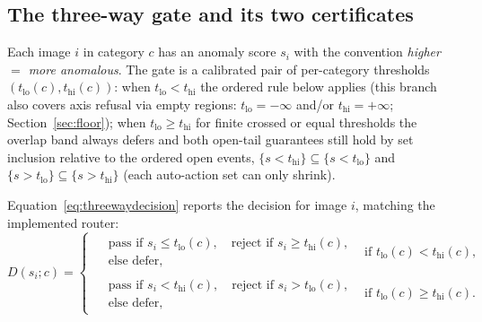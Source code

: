 \documentclass[preprint,11pt]{elsarticle}
\begin{document}
\subsection{The three-way gate and its two certificates}
\label{sec:gate}

Each image $i$ in category $c$ has an anomaly score $s_i$ with the convention \emph{higher
$=$ more anomalous}. The gate is a calibrated pair of per-category thresholds
$(t_{\text{lo}}(c), t_{\text{hi}}(c))$: when $t_{\text{lo}} < t_{\text{hi}}$ the ordered rule
below applies (this branch also covers axis refusal via empty regions:
$t_{\text{lo}}=-\infty$ and/or $t_{\text{hi}}=+\infty$; Section~\ref{sec:floor}); when
$t_{\text{lo}} \ge t_{\text{hi}}$ for finite crossed or equal thresholds the overlap
band always defers and both open-tail guarantees still hold by set inclusion relative to the
ordered open events,
$\{s < t_{\text{hi}}\} \subseteq \{s < t_{\text{lo}}\}$ and
$\{s > t_{\text{lo}}\} \subseteq \{s > t_{\text{hi}}\}$
(each auto-action set can only shrink).

Equation~\eqref{eq:threewaydecision} reports the decision for image $i$, matching the
implemented router:
\begin{equation}
D(s_i;c)=
\begin{cases}
\begin{aligned}
&\text{pass if } s_i \le t_{\text{lo}}(c),\quad
\text{reject if } s_i \ge t_{\text{hi}}(c),\\
&\text{else defer},
\end{aligned}
& \text{if } t_{\text{lo}}(c) < t_{\text{hi}}(c),\\[6pt]
\begin{aligned}
&\text{pass if } s_i < t_{\text{hi}}(c),\quad
\text{reject if } s_i > t_{\text{lo}}(c),\\
&\text{else defer},
\end{aligned}
& \text{if } t_{\text{lo}}(c) \ge t_{\text{hi}}(c).
\end{cases}
\label{eq:threewaydecision}
\end{equation}
\end{document}
